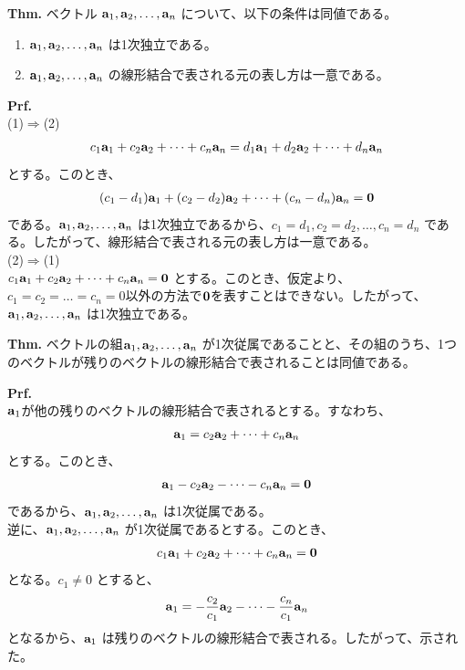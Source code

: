 \documentclass[a4paper,11pt]{jsarticle}
\numberwithin{equation}{section}
\begin{document}
\begin{itembox}[l]{\textbf{Thm.}}
  ベクトル $\vb{a}_1, \vb{a}_2, \dots, \vb{a}_n$ について、以下の条件は同値である。
  \begin{enumerate}
    \item $\vb{a}_1, \vb{a}_2, \dots, \vb{a}_n$ は1次独立である。
    \item $\vb{a}_1, \vb{a}_2, \dots, \vb{a}_n$ の線形結合で表される元の表し方は一意である。
  \end{enumerate}
\end{itembox}
\textbf{Prf.}\\
(1)$\Rightarrow$(2)\\
\begin{align}
  c_1\vb{a}_1 + c_2\vb{a}_2 + \dots + c_n\vb{a}_n = d_1\vb{a}_1 + d_2\vb{a}_2 + \dots + d_n\vb{a}_n
\end{align}
とする。このとき、
\begin{align}
  (c_1-d_1)\vb{a}_1 + (c_2-d_2)\vb{a}_2 + \dots + (c_n-d_n)\vb{a}_n = \vb{0}
\end{align}
である。$\vb{a}_1, \vb{a}_2, \dots, \vb{a}_n$ は1次独立であるから、$c_1=d_1, c_2=d_2, \dots, c_n=d_n$ である。したがって、線形結合で表される元の表し方は一意である。\\
(2)$\Rightarrow$(1)\\
$c_1\vb{a}_1 + c_2\vb{a}_2 + \dots + c_n\vb{a}_n = \vb{0}$ とする。このとき、仮定より、$c_1=c_2=\dots=c_n=0$以外の方法で$\vb{0}$を表すことはできない。したがって、$\vb{a}_1, \vb{a}_2, \dots, \vb{a}_n$ は1次独立である。\hfill\qedsymbol\\

\begin{itembox}[l]{\textbf{Thm.}}
  ベクトルの組$\vb{a}_1, \vb{a}_2, \dots, \vb{a}_n$ が1次従属であることと、その組のうち、1つのベクトルが残りのベクトルの線形結合で表されることは同値である。
\end{itembox}
\textbf{Prf.}\\
$\vb{a}_1$が他の残りのベクトルの線形結合で表されるとする。すなわち、
\begin{align}
  \vb{a}_1 = c_2\vb{a}_2 + \dots + c_n\vb{a}_n
\end{align}
とする。このとき、
\begin{align}
  \vb{a}_1 - c_2\vb{a}_2 - \dots - c_n\vb{a}_n = \vb{0}
\end{align}
であるから、$\vb{a}_1, \vb{a}_2, \dots, \vb{a}_n$ は1次従属である。\\
逆に、$\vb{a}_1, \vb{a}_2, \dots, \vb{a}_n$ が1次従属であるとする。このとき、
\begin{align}
  c_1\vb{a}_1 + c_2\vb{a}_2 + \dots + c_n\vb{a}_n = \vb{0}
\end{align}
となる。$c_1 \neq 0$ とすると、
\begin{align}
  \vb{a}_1 = -\frac{c_2}{c_1}\vb{a}_2 - \dots - \frac{c_n}{c_1}\vb{a}_n
\end{align}
となるから、$\vb{a}_1$ は残りのベクトルの線形結合で表される。したがって、示された。\hfill\qedsymbol\\
\end{document}
